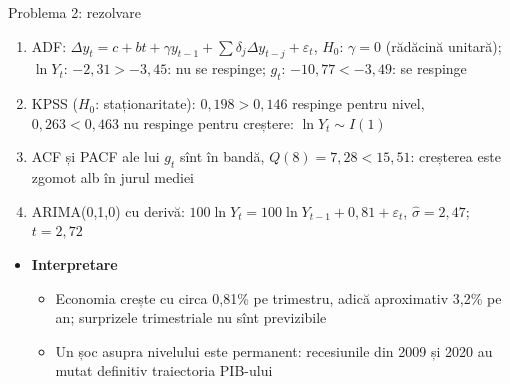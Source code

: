 \begin{frame}{Problema 2: rezolvare}
\itemsize{\footnotesize}
\begin{enumerate}
    \item ADF: $\Delta y_t = c + bt + \gamma y_{t-1} + \sum\delta_j\Delta y_{t-j} + \varepsilon_t$, $H_0$: $\gamma = 0$ (rădăcină unitară); $\ln Y_t$: $\ensuremath{-}2{,}31 > \ensuremath{-}3{,}45$: nu se respinge; $g_t$: $\ensuremath{-}10{,}77 < \ensuremath{-}3{,}49$: se respinge
    \item KPSS ($H_0$: staționaritate): $0{,}198 > 0{,}146$ respinge pentru nivel, $0{,}263 < 0{,}463$ nu respinge pentru creștere: $\ln Y_t \sim I(1)$
    \item ACF și PACF ale lui $g_t$ sînt în bandă, $Q(8) = 7{,}28 < 15{,}51$: creșterea este zgomot alb în jurul mediei
    \item ARIMA(0,1,0) cu derivă: $100\ln Y_t = 100\ln Y_{t-1} + 0{,}81 + \varepsilon_t$, $\hat\sigma = 2{,}47$; $t = 2{,}72$
\end{enumerate}
\begin{itemize}
    \item \textbf{Interpretare}
    \begin{itemize}
        \item Economia crește cu circa 0{,}81\% pe trimestru, adică aproximativ 3{,}2\% pe an; surprizele trimestriale nu sînt previzibile
        \item Un șoc asupra nivelului este permanent: recesiunile din 2009 și 2020 au mutat definitiv traiectoria PIB-ului
    \end{itemize}
\end{itemize}
\end{frame}

